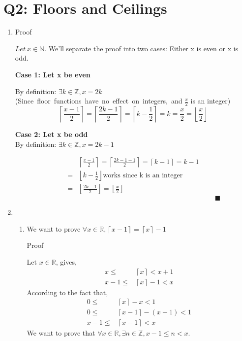 \documentclass[12pt]{article}
\begin{document}
\section{Q2: Floors and Ceilings}
\begin{enumerate}[label=(\alph*)]
	\item Proof

$Let\ x \in \mathbb{N}.$ We'll separate the proof into two cases: Either x is even or x is odd. 

\textbf{Case 1: Let x be even} 

By definition: $\exists k \in \mathbb{Z}, x = 2k$  (Since\ floor\ functions\ have\ no\ effect\ on\ integers,\ and $\frac{x}{2}$ is an integer)
$$\left \lceil \frac{x-1}{2} \right \rceil 
    = \left \lceil \frac{2k-1}{2} \right\rceil 
    = \left\lceil k - \frac{1}{2} \right \rceil 
    = k 
    = \frac{x}{2} 
    = \left\lfloor \frac{x}{2} \right\rfloor $$
   
 
\textbf{Case 2: Let x be odd} \\
By definition: $\exists k \in \mathbb{Z}, x = 2k - 1$

\begin{align*}
	&\left \lceil \frac{x-1}{2} \right \rceil 
    = \left \lceil \frac{2k-1 - 1}{2} \right\rceil 
    = \left\lceil k - 1 \right \rceil 
    = k - 1 \\
    = &\left\lfloor k - \frac{1}{2} \right\rfloor \text{works since k is an integer} \\
    = &\left\lfloor \frac{2k - 1}{2} \right\rfloor
    = \left\lfloor \frac{x}{2} \right\rfloor 
\end{align*}
$\quad \quad \quad \quad \quad \quad \quad \quad \quad \quad \quad \quad \quad \quad \quad \quad \quad \quad \quad \quad \quad \quad \quad \quad \quad \quad \quad \quad \quad \blacksquare $

\item 
	\begin{enumerate}[label=(\roman*)]
	\setcounter{enumii}{0}
		\item We want to prove $\forall x \in \mathbb{R}, \left \lceil x-1 \right \rceil = \left \lceil x \right \rceil - 1$

Proof

Let $x \in \mathbb{R}$, gives,
\begin{align*}
	x \leq &\left \lceil x \right \rceil < x + 1 \\
	x - 1 \leq &\left \lceil x \right \rceil - 1 < x
\end{align*}
According to the fact that, 
\begin{align*}
	0 \leq &\left \lceil x \right \rceil - x < 1 \\
	0 \leq &\left \lceil x - 1 \right \rceil - (x - 1) < 1 \\
	x - 1 \leq &\left \lceil x - 1 \right \rceil < x
\end{align*}
We want to prove that $\forall x \in \mathbb{R}, \exists n \in \mathbb{Z}, x -1 \leq n < x $.


\end{enumerate}
\end{enumerate}
\end{document}

